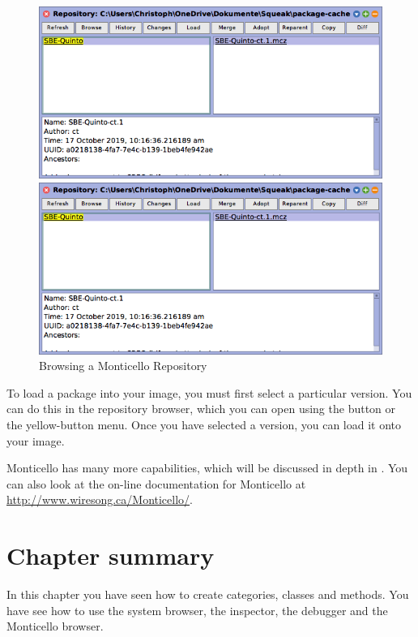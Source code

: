 \documentclass[a4paper,10pt,twoside]{book}
\begin{document}
\begin{figure}[hbt]
\ifluluelse
	{\centerline {\includegraphics[width=\textwidth]{BrowseRepository}}}
	{\centerline {\includegraphics[scale=0.7]{BrowseRepository}}}
\caption{Browsing a Monticello Repository
\label{fig:monticello3}}
\end{figure}


To load a package into your image, you must first select a particular version.  You can do this in the repository browser, which you can open using the  button or the yellow-button menu.  Once you have selected a version, you can load it onto your image.


Monticello has many more capabilities, which will be discussed in depth in .
You can also look at the on-line documentation for Monticello at \url{http://www.wiresong.ca/Monticello/}.

\section{Chapter summary}
In this chapter you have seen how to create categories, classes and methods.  You have see how to use the system browser, the inspector, the debugger and the Monticello browser.
\end{document}
